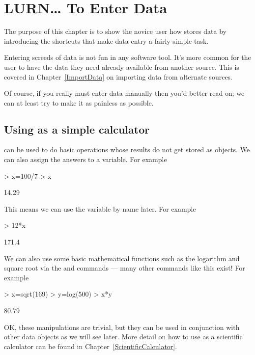 \chapter{LURN\ldots{} To Enter Data}
\label{DataEntry}



The purpose of this chapter is to show the novice \R{} user how \R{} stores data by introducing the shortcuts that make data entry a fairly simple task.

Entering screeds of data is not fun in any software tool. It's more common for the \R{} user to have the data they need already available from another source. This is covered in Chapter~\ref{ImportData} on importing data from alternate sources.

Of course, if you really must enter data manually then you'd better read on; we can at least try to make it as painless as possible.

\section{Using \R{} as a simple calculator}
\label{SimpleCalculator}

\R{} can be used to do basic operations whose results do not get stored as objects. We can also assign the answers to a variable. For example
\begin{Schunk}
\begin{Sinput}
> x=100/7
> x
\end{Sinput}
\begin{Soutput}
[1] 14.29
\end{Soutput}
\end{Schunk}
This means we can use the variable by name later. For example
\begin{Schunk}
\begin{Sinput}
> 12*x
\end{Sinput}
\begin{Soutput}
[1] 171.4
\end{Soutput}
\end{Schunk}

We can also use some basic mathematical functions such as the logarithm and square root via the  and  commands --- many other commands like this exist! For example
\begin{Schunk}
\begin{Sinput}
> x=sqrt(169)
> y=log(500)
> x*y
\end{Sinput}
\begin{Soutput}
[1] 80.79
\end{Soutput}
\end{Schunk}
OK, these manipulations are trivial, but they can be used in conjunction with other data objects as we will see later. More detail on how to use \R{} as a scientific calculator can be found in Chapter~\ref{ScientificCalculator}.


